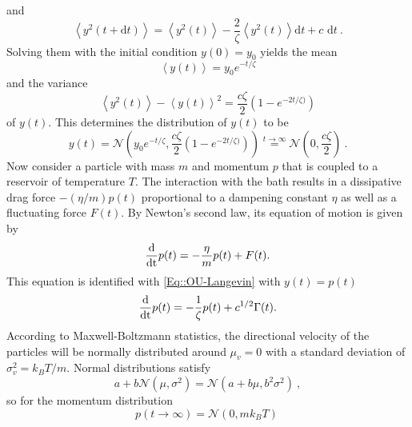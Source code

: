 	and
	\begin{equation}
		\left \langle y^2(t + \text{d}t) \right \rangle =	\left \langle y^2(t) \right \rangle - \frac{2}{\zeta} \left \langle y^2(t) \right \rangle \text{d}t  + c \text{ d}t~.
	\end{equation}
	Solving them with the initial condition $y(0) =	y_0$ yields the mean
	\begin{equation}
		\left \langle y(t) \right \rangle =	 y_0 e^{-t/\zeta}
	\end{equation}
	and the variance
	\begin{equation}
		\left \langle y^2(t) \right \rangle - \left \langle y(t) \right \rangle^2 =	\frac{c\zeta}{2} \left(1 - e^{-2t /	\zeta)}\right)
	\end{equation}
	of $y(t)$. This determines the distribution of $y(t)$ to be
	\begin{equation} \label{Eq::OU-Distribution}
		y(t) =	\mathcal{N}\left(y_0 e^{-t/\zeta}, \frac{c\zeta}{2} \left(1 - e^{-2t /	\zeta)}\right)\right) \overset{t \rightarrow \infty}{=} \mathcal{N}\left(0 , \frac{c\zeta}{2}\right) ~.
	\end{equation}
	Now consider a particle with mass $m$ and momentum $p$ that is coupled to a reservoir of temperature $T$. The interaction with the bath results in a dissipative drag force $- ({\eta}/{m}) p(t)$ proportional to a dampening constant $\eta$ as well as a fluctuating force $F(t)$. By Newton's second law, its equation of motion is given by
	\begin{equation}
		\frac{\text{d}}{\text{\text{d}t}} p(t) =	- \frac{\eta}{m} p(t) + F(t).
	\end{equation}
	This equation is identified with \autoref{Eq::OU-Langevin} with $y(t) = p(t)$
	\begin{equation}
		\frac{\text{d}}{\text{\text{d}t}} p(t) =	- \frac{1}{\zeta} p(t) + { c^{1/2}}{} \Gamma(t).
	\end{equation}
	According to Maxwell-Boltzmann statistics, the directional velocity of the particles will be normally distributed around $\mu_v = 0$ with a standard deviation of $\sigma_v^2 =	k_B T /	m$. Normal distributions satisfy
	\begin{equation}
			a + b \mathcal{N}(\mu, \sigma^2) =	\mathcal{N}(a + b\mu, b^2\sigma^2)~,
	\end{equation}
	so for the momentum distribution 
	\begin{equation} \label{Eq::Maxwell-Boltzmann}
		p(t\rightarrow \infty) =	\mathcal{N}(0, m k_B T)~
	\end{equation}
